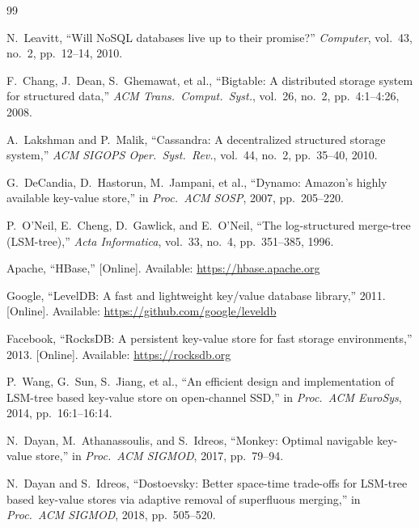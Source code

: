 \documentclass[oneside,a4paper,12pt]{book}
\begin{document}



\begin{thebibliography}{99}

N.~Leavitt, ``Will NoSQL databases live up to their promise?'' \textit{Computer}, vol.~43, no.~2, pp.~12--14, 2010.

F.~Chang, J.~Dean, S.~Ghemawat, et al., ``Bigtable: A distributed storage system for structured data,'' \textit{ACM Trans.\ Comput.\ Syst.}, vol.~26, no.~2, pp.~4:1--4:26, 2008.

A.~Lakshman and P.~Malik, ``Cassandra: A decentralized structured storage system,'' \textit{ACM SIGOPS Oper.\ Syst.\ Rev.}, vol.~44, no.~2, pp.~35--40, 2010.

G.~DeCandia, D.~Hastorun, M.~Jampani, et al., ``Dynamo: Amazon's highly available key-value store,'' in \textit{Proc.\ ACM SOSP}, 2007, pp.~205--220.

P.~O'Neil, E.~Cheng, D.~Gawlick, and E.~O'Neil, ``The log-structured merge-tree (LSM-tree),'' \textit{Acta Informatica}, vol.~33, no.~4, pp.~351--385, 1996.

Apache, ``HBase,'' [Online]. Available: \url{https://hbase.apache.org}

Google, ``LevelDB: A fast and lightweight key/value database library,'' 2011. [Online]. Available: \url{https://github.com/google/leveldb}

Facebook, ``RocksDB: A persistent key-value store for fast storage environments,'' 2013. [Online]. Available: \url{https://rocksdb.org}

P.~Wang, G.~Sun, S.~Jiang, et al., ``An efficient design and implementation of LSM-tree based key-value store on open-channel SSD,'' in \textit{Proc.\ ACM EuroSys}, 2014, pp.~16:1--16:14.

N.~Dayan, M.~Athanassoulis, and S.~Idreos, ``Monkey: Optimal navigable key-value store,'' in \textit{Proc.\ ACM SIGMOD}, 2017, pp.~79--94.

N.~Dayan and S.~Idreos, ``Dostoevsky: Better space-time trade-offs for LSM-tree based key-value stores via adaptive removal of superfluous merging,'' in \textit{Proc.\ ACM SIGMOD}, 2018, pp.~505--520.


\end{thebibliography}
\end{document}
